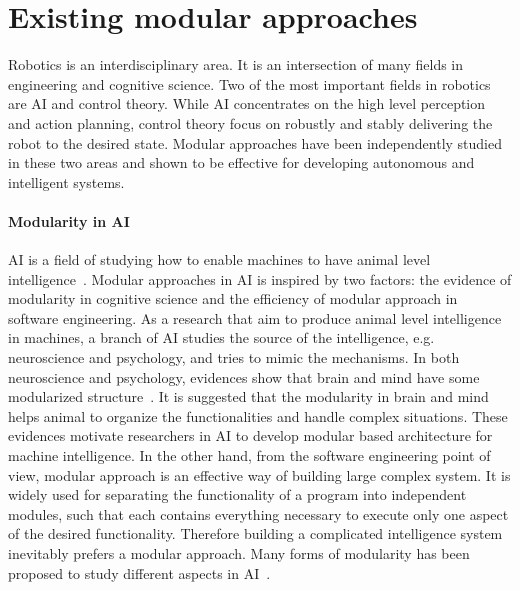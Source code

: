 \section{Existing modular approaches}
\label{cha1:modular}
Robotics is an interdisciplinary area. It is an intersection of many fields in engineering and cognitive science. Two of the most important fields in robotics are AI and control theory. While AI concentrates on the high level perception and action planning, control theory focus on robustly and stably delivering the robot to the desired state. Modular approaches have been independently studied in these two areas and shown to be effective for developing autonomous and intelligent systems.

\paragraph{Modularity in AI}
AI is a field of studying how to enable machines to have animal level intelligence~\citep{brooks1991intelligence}. Modular approaches in AI is inspired by two factors: the evidence of modularity in cognitive science and the efficiency of modular approach in software engineering.
As a research that aim to produce animal level intelligence in machines, a branch of AI studies the source of the intelligence, e.g. neuroscience and psychology, and tries to mimic the mechanisms. In both neuroscience and psychology, evidences show that brain and mind have some modularized structure~\citep{fodor1983modularity,peretz2003modularity,barrett2006modularity,sztarker2011brain}. It is suggested that the modularity in brain and mind helps animal to organize the functionalities and handle complex situations. These evidences motivate researchers in AI to develop modular based architecture for machine intelligence. In the other hand, from the software engineering point of view, modular approach is an effective way of building large complex system. It is widely used for separating the functionality of a program into independent modules, such that each contains everything necessary to execute only one aspect of the desired functionality. Therefore building a complicated intelligence system inevitably prefers a modular approach. Many forms of modularity has been proposed to study different aspects in AI~\citep{bryson2004modular}.


